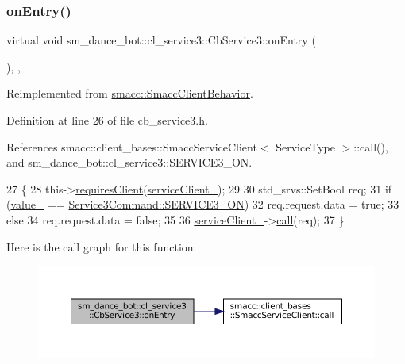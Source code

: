 \subsubsection{\texorpdfstring{on\+Entry()}{onEntry()}}
{\footnotesize\ttfamily virtual void sm\+\_\+dance\+\_\+bot\+::cl\+\_\+service3\+::\+Cb\+Service3\+::on\+Entry (\begin{DoxyParamCaption}{ }\end{DoxyParamCaption})\hspace{0.3cm}{\ttfamily [inline]}, {\ttfamily [override]}, {\ttfamily [virtual]}}



Reimplemented from \hyperlink{classsmacc_1_1SmaccClientBehavior_ad5d3e1f1697c3cfe66c94cadba948493}{smacc\+::\+Smacc\+Client\+Behavior}.



Definition at line 26 of file cb\+\_\+service3.\+h.



References smacc\+::client\+\_\+bases\+::\+Smacc\+Service\+Client$<$ Service\+Type $>$\+::call(), and sm\+\_\+dance\+\_\+bot\+::cl\+\_\+service3\+::\+S\+E\+R\+V\+I\+C\+E3\+\_\+\+ON.


\begin{DoxyCode}
27   \{
28     this->\hyperlink{classsmacc_1_1ISmaccClientBehavior_a32b16e99e3b4cb289414203dc861a440}{requiresClient}(\hyperlink{classsm__dance__bot_1_1cl__service3_1_1CbService3_aad53b5aa5eb595c5add3701cfe72079c}{serviceClient\_});
29 
30     std\_srvs::SetBool req;
31     \textcolor{keywordflow}{if} (\hyperlink{classsm__dance__bot_1_1cl__service3_1_1CbService3_a9df8640d9bc42607256ca76df60a5af0}{value\_} == \hyperlink{namespacesm__dance__bot_1_1cl__service3_adbcecb84d61edff09f1fb67ef9607ac4a13cdca48a01bbb44fa8fb35567fbc58e}{Service3Command::SERVICE3\_ON})
32       req.request.data = \textcolor{keyword}{true};
33     \textcolor{keywordflow}{else}
34       req.request.data = \textcolor{keyword}{false};
35 
36     \hyperlink{classsm__dance__bot_1_1cl__service3_1_1CbService3_aad53b5aa5eb595c5add3701cfe72079c}{serviceClient\_}->\hyperlink{classsmacc_1_1client__bases_1_1SmaccServiceClient_a0e9914f45f1091c38bb9ad6187d07977}{call}(req);
37   \}
\end{DoxyCode}
Here is the call graph for this function\+:
\nopagebreak
\begin{figure}[H]
\begin{center}
\leavevmode
\includegraphics[width=350pt]{classsm__dance__bot_1_1cl__service3_1_1CbService3_ae9e3796b507ad96cc0890fec0f64a4b7_cgraph}
\end{center}
\end{figure}


